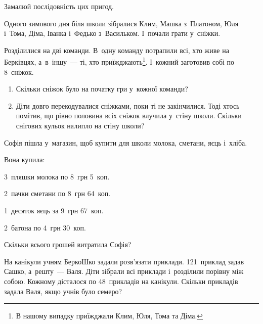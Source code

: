 Замалюй послідовність цих пригод.


\problem
Одного зимового дня біля школи зібралися Клим, Машка з~Платоном, Юля і~Тома,
Діма, Іванка і~Федько з~Васильком. І~почали грати у~сніжки.

Розділилися на дві команди. В~одну команду потрапили всі,
хто живе на Берківцях, а~в~іншу~--- ті, хто приїжджають\footnote{
  В нашому випадку приїжджали Клим, Юля, Тома та Діма.
}.
І~кожний заготовив собі по 8~сніжок.

\begin{enumerate}
  \item Скільки сніжок було на початку гри у~кожної команди?
  \item Діти довго перекодувалися сніжками, поки ті не закінчилися.
  Тоді хтось помітив, що рівно половина всіх сніжок влучила у~стіну школи.
  Скільки снігових кульок налипло на стіну школи?
\end{enumerate}


\problem
Софія пішла у~магазин, щоб купити для школи молока, сметани, яєць і~хліба.

Вона купила:

3~пляшки молока по 8~грн 5~коп.

2~пачки сметани по 8~грн 64~коп.

1~десяток яєць за 9~грн 67~коп.

2~батона по 4~грн 30~коп.

Скільки всього грошей витратила Софія?


\problem
На канікули учням БеркоШко задали розв'язати приклади.
121~приклад задав Сашко, а~решту~--- Валя.
Діти зібрали всі приклади і~розділили порівну між собою.
Кожному дісталося по 48~прикладів на канікули.
Скільки прикладів задала Валя, якщо учнів було семеро?


